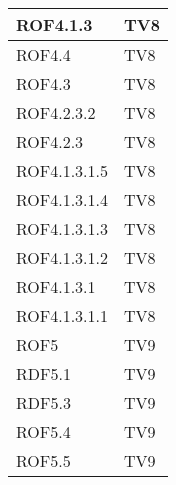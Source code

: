 \begin{center}
\begin{longtable}{|p{7cm}|p{7cm}|}
\midrule
ROF4.1.3
& TV8\\

\midrule
ROF4.4
& TV8\\

\midrule
ROF4.3
& TV8\\

\midrule
ROF4.2.3.2
& TV8\\

\midrule
ROF4.2.3
& TV8\\

\midrule
ROF4.1.3.1.5
& TV8\\

\midrule
ROF4.1.3.1.4
& TV8\\

\midrule
ROF4.1.3.1.3
& TV8\\

\midrule
ROF4.1.3.1.2
& TV8\\

\midrule
ROF4.1.3.1
& TV8\\

\midrule
ROF4.1.3.1.1
& TV8\\

\midrule
ROF5
& TV9\\

\midrule
RDF5.1
& TV9\\

\midrule
RDF5.3
& TV9\\

\midrule
ROF5.4
& TV9\\

\midrule
ROF5.5
& TV9\\

\end{longtable}
\end{center}

